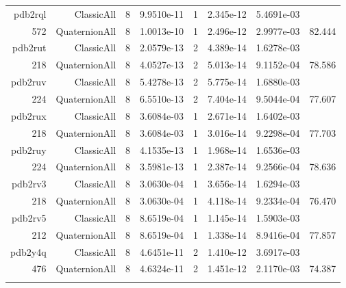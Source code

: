 \begin{xltabular}{\textwidth}{r|rcS[table-format=1.4e+2]cS[table-format=1.3e+2]S[table-format=1.4e+2]S[table-format=-1.3]}
pdb2rql & ClassicAll & 8 & 9.9510e-11 & 1 & 2.345e-12 & 5.4691e-03 & \\
572 & QuaternionAll & 8 & 1.0013e-10 & 1 & 2.496e-12 & 2.9977e-03 & 82.444\\  \addlinespace
pdb2rut & ClassicAll & 8 & 2.0579e-13 & 2 & 4.389e-14 & 1.6278e-03 & \\
218 & QuaternionAll & 8 & 4.0527e-13 & 2 & 5.013e-14 & 9.1152e-04 & 78.586\\  \addlinespace
pdb2ruv & ClassicAll & 8 & 5.4278e-13 & 2 & 5.775e-14 & 1.6880e-03 & \\
224 & QuaternionAll & 8 & 6.5510e-13 & 2 & 7.404e-14 & 9.5044e-04 & 77.607\\  \addlinespace
pdb2rux & ClassicAll & 8 & 3.6084e-03 & 1 & 2.671e-14 & 1.6402e-03 & \\
218 & QuaternionAll & 8 & 3.6084e-03 & 1 & 3.016e-14 & 9.2298e-04 & 77.703\\  \addlinespace
pdb2ruy & ClassicAll & 8 & 4.1535e-13 & 1 & 1.968e-14 & 1.6536e-03 & \\
224 & QuaternionAll & 8 & 3.5981e-13 & 1 & 2.387e-14 & 9.2566e-04 & 78.636\\  \addlinespace
pdb2rv3 & ClassicAll & 8 & 3.0630e-04 & 1 & 3.656e-14 & 1.6294e-03 & \\
218 & QuaternionAll & 8 & 3.0630e-04 & 1 & 4.118e-14 & 9.2334e-04 & 76.470\\  \addlinespace
pdb2rv5 & ClassicAll & 8 & 8.6519e-04 & 1 & 1.145e-14 & 1.5903e-03 & \\
212 & QuaternionAll & 8 & 8.6519e-04 & 1 & 1.338e-14 & 8.9416e-04 & 77.857\\  \addlinespace
pdb2y4q & ClassicAll & 8 & 4.6451e-11 & 2 & 1.410e-12 & 3.6917e-03 & \\
476 & QuaternionAll & 8 & 4.6324e-11 & 2 & 1.451e-12 & 2.1170e-03 & 74.387\\  \addlinespace
\end{xltabular}
